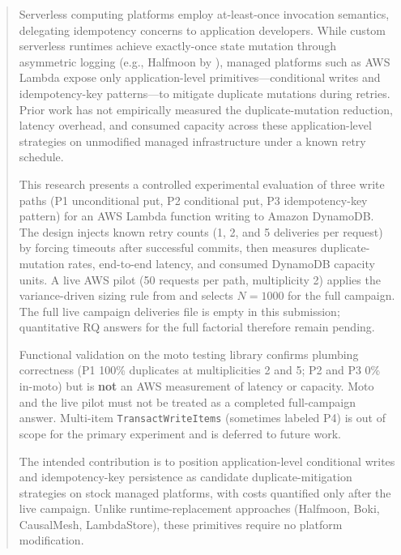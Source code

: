 \begin{abstract}

Serverless computing platforms employ at-least-once invocation semantics, delegating idempotency concerns to application developers. While custom serverless runtimes achieve exactly-once state mutation through asymmetric logging (e.g., Halfmoon by \citet{Qi2025Halfmoon}), managed platforms such as AWS Lambda expose only application-level primitives---conditional writes and idempotency-key patterns---to mitigate duplicate mutations during retries. Prior work has not empirically measured the duplicate-mutation reduction, latency overhead, and consumed capacity across these application-level strategies on unmodified managed infrastructure under a known retry schedule.

This research presents a controlled experimental evaluation of three write paths (P1 unconditional put, P2 conditional put, P3 idempotency-key pattern) for an AWS Lambda function writing to Amazon DynamoDB. The design injects known retry counts (1, 2, and 5 deliveries per request) by forcing timeouts after successful commits, then measures duplicate-mutation rates, end-to-end latency, and consumed DynamoDB capacity units. A live AWS pilot (50 requests per path, multiplicity 2) applies the variance-driven sizing rule from \citet{Wen2025Variance} and selects $N = 1000$ for the full campaign. The full live campaign deliveries file is empty in this submission; quantitative RQ answers for the full factorial therefore remain pending.

Functional validation on the moto testing library confirms plumbing correctness (P1 100\% duplicates at multiplicities 2 and 5; P2 and P3 0\% in-moto) but is \textbf{not} an AWS measurement of latency or capacity. Moto and the live pilot must not be treated as a completed full-campaign answer. Multi-item \texttt{TransactWriteItems} (sometimes labeled P4) is out of scope for the primary experiment and is deferred to future work.

The intended contribution is to position application-level conditional writes and idempotency-key persistence as candidate duplicate-mitigation strategies on stock managed platforms, with costs quantified only after the live campaign. Unlike runtime-replacement approaches (Halfmoon, Boki, CausalMesh, LambdaStore), these primitives require no platform modification.

\end{abstract}
